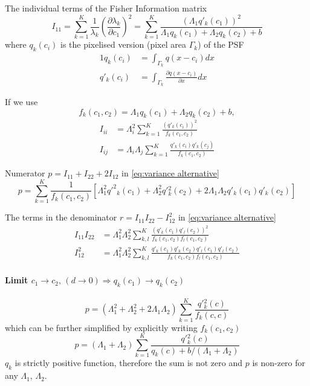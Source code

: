 The individual terms of the Fisher Information matrix 
%
\begin{equation}
	I_{11}=\sum_{k=1}^K\frac{1}{\lambda_k}\left(\frac{\partial\lambda_k}{\partial c_1}\right)^2=\sum_{k=1}^K\frac{\left(\Lambda_1q'_k(c_1)\right)^2}{\Lambda_1q_k(c_1)+\Lambda_2q_k(c_2)+b}
\end{equation}
%
where $q_k(c_i)$ is the pixelised version (pixel area $\Gamma_k$) of the PSF
%
\begin{alignat*}{1}
	q_k(c_i) & =\int_{\Gamma_k}q(x-c_i)dx\\
	q'_k(c_i) & =\int_{\Gamma_k}\frac{\partial q(x-c_i)}{\partial x}dx
\end{alignat*}

If we use 
%
\begin{equation}
	f_k(c_1,c_2)=\Lambda_1q_k(c_1)+\Lambda_2q_k(c_2)+b,
\end{equation}
%
\begin{equation}
	\begin{aligned}I_{ii} & =\Lambda_i^2\sum_{k=1}^K\frac{\left(q'_k(c_i)\right)^2}{f_k(c_1,c_2)}\\
		I_{ij} & =\Lambda_i\Lambda_j\sum_{k=1}^K\frac{q'_k(c_i)q'_k(c_j)}{f_k(c_1,c_2)}
	\end{aligned}
	\label{eq:Fisher Information alternative - Individual}
\end{equation}
 
Numerator $p=I_{11}+I_{22}+2I_{12}$ in \autoref{eq:variance alternative}
\begin{equation}
	p=\sum_{k=1}^K\frac{1}{f_k(c_1,c_2)}\left[\Lambda_1^2q'^2{}_k(c_1)+\Lambda_2^2q'{}_k^2(c_2)+2\Lambda_1\Lambda_2q'_k(c_1)q'_k(c_2)\right]
\end{equation}

The terms in the denominator $r=I_{11}I_{22}-I_{12}^2$ in \autoref{eq:variance alternative}
%
\begin{equation}
	\begin{alignedat}{1}
		I_{11}I_{22} & =\Lambda_1^2\Lambda_2^2\sum_{k,l}^K\frac{\left(q'_k(c_1)q'_l(c_2)\right)^2}{f_k(c_1,c_2)f_l(c_1,c_2)}\\
		I_{12}^2 & =\Lambda_1^2\Lambda_2^2\sum_{k,l}^K\frac{q'_k(c_1)q'_k(c_2)q'_l(c_1)q'_l(c_2)}{f_k(c_1,c_2)f_l(c_1,c_2)}
	\end{alignedat}
\end{equation}

\paragraph*{Limit $c_1\rightarrow c_2,\,(d\rightarrow0)\Rightarrow q_k(c_1)\rightarrow q_k(c_2)$}
%
\begin{equation}
	p=(\Lambda_1^2+\Lambda_2^2+2\Lambda_1\Lambda_2)\sum_{k=1}^K\frac{q'{}_k^2(c)}{f_k(c,c)}
\end{equation}
%
which can be further simplified by explicitly writing $f_k(c_1,c_2)$
%
\begin{equation}
	p=(\Lambda_1+\Lambda_2)\sum_{k=1}^K\frac{q'{}_k^2(c)}{q_k(c)+b/(\Lambda_1+\Lambda_2)}
\end{equation}
%
$q_k$ is strictly positive function, therefore the sum is not zero and $p$ is non-zero for any $\Lambda_1,\,\Lambda_2$. 

